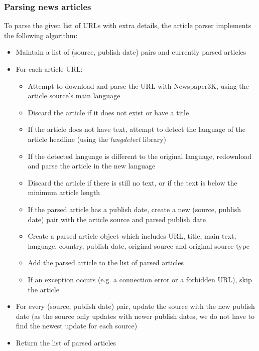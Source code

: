 \documentclass{l4proj}
\begin{document}
\subsubsection{Parsing news articles} \hfill \par
To parse the given list of URLs with extra details, the article parser implements the following algorithm:
\begin{itemize}
    \item Maintain a list of (source, publish date) pairs and currently parsed articles
    \item For each article URL:
    \begin{itemize}
        \item Attempt to download and parse the URL with Newspaper3K, using the article source's main language
        \item Discard the article if it does not exist or have a title
        \item If the article does not have text, attempt to detect the language of the article headline (using the \emph{langdetect} library)
        \item If the detected language is different to the original language, redownload and parse the article in the new language
        \item Discard the article if there is still no text, or if the text is below the minimum article length
        \item If the parsed article has a publish date, create a new (source, publish date) pair with the article source and parsed publish date
        \item Create a parsed article object which includes URL, title, main text, language, country, publish date, original source and original source type
        \item Add the parsed article to the list of parsed articles
        \item If an exception occurs (e.g. a connection error or a forbidden URL), skip the article
    \end{itemize}
    \item For every (source, publish date) pair, update the source with the new publish date (as the source only updates with newer publish dates, we do not have to find the newest update for each source)
    \item Return the list of parsed articles
\end{itemize}
\end{document}
